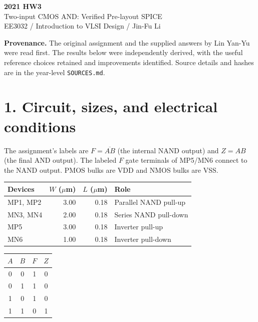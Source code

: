 \documentclass[11pt,a4paper]{article}
\newcommand{\VDD}{V_{\mathrm{DD}}}
\newcommand{\VSS}{V_{\mathrm{SS}}}
\newcommand{\MOS}[5]{
  \coordinate (#1) at (#2,#3);
  \coordinate (#1t) at ($(#1)+(0,.55)$);
  \coordinate (#1b) at ($(#1)+(0,-.55)$);
  \draw (#1t)--($(#1)+(0,.30)$)--($(#1)+(-.18,.30)$);
  \draw ($(#1)+(-.18,.34)$)--($(#1)+(-.18,-.34)$);
  \draw ($(#1)+(-.18,-.30)$)--($(#1)+(0,-.30)$)--(#1b);
  \draw ($(#1)+(-.35,.33)$)--($(#1)+(-.35,-.33)$);
  \def\type{#5}\def\ptype{p}
  \ifx\type\ptype
    \draw ($(#1)+(-.78,0)$)--($(#1)+(-.53,0)$);
    \draw ($(#1)+(-.465,0)$) circle (.065);
    \draw ($(#1)+(-.40,0)$)--($(#1)+(-.35,0)$);
  \else
    \draw ($(#1)+(-.78,0)$)--($(#1)+(-.35,0)$);
  \fi
  \node[anchor=east] at ($(#1)+(-.82,0)$) {$#4$};
  \node[anchor=west,font=\scriptsize] at ($(#1)+(.10,0)$) {#1};
}
\begin{document}
\begin{center}{\LARGE\bfseries 2021 HW3}\\[4pt]{\large Two-input CMOS AND: Verified Pre-layout SPICE}\\[4pt]{\small EE3032 / Introduction to VLSI Design / Jin-Fu Li}\end{center}
\textbf{Provenance.} The original assignment and the supplied answers by Lin Yan-Yu were read first. The results below were independently derived, with the useful reference choices retained and improvements identified. Source details and hashes are in the year-level \texttt{SOURCES.md}.

\section*{1. Circuit, sizes, and electrical conditions}
The assignment's labels are $F=\overline{AB}$ (the internal NAND output) and $Z=AB$ (the final AND output). The labeled $F$ gate terminals of MP5/MN6 connect to the NAND output. PMOS bulks are VDD and NMOS bulks are VSS.
\begin{center}\end{center}
\begin{center}\begin{tabular}{lrrl}\toprule
Devices&$W$ ($\mu$m)&$L$ ($\mu$m)&Role\\\midrule
MP1, MP2&3.00&0.18&Parallel NAND pull-up\\
MN3, MN4&2.00&0.18&Series NAND pull-down\\
MP5&3.00&0.18&Inverter pull-up\\
MN6&1.00&0.18&Inverter pull-down\\\bottomrule
\end{tabular}\qquad\begin{tabular}{cc|cc}\toprule
$A$&$B$&$F$&$Z$\\\midrule0&0&1&0\\0&1&1&0\\1&0&1&0\\1&1&0&1\\\bottomrule
\end{tabular}\end{center}
\end{document}
